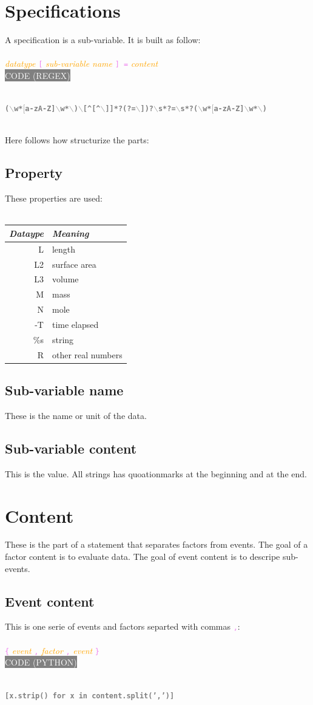 \documentclass[15pt,a4paper,oneside]{article}
\newcommand{\regex}[1]{{\tiny\\\colorbox{grey}{\textcolor{white}{CODE (REGEX)}\hspace{0.87\textwidth}}}\vspace{-2.2em}\\\begin{framed}\bf{\textcolor{grey}{\vspace{-1.5em}\\\texttt{\small #1}}}\vspace{-0.33em}\end{framed}\vspace{-0.75em}}
\newcommand{\python}[1]{{\tiny\\\colorbox{grey}{\textcolor{white}{\tiny CODE (PYTHON)}\hspace{0.855\textwidth}}}\vspace{-2.2em}\\\begin{framed}\bf{\textcolor{grey}{\vspace{-1.5em}\\\texttt{\small #1}}}\vspace{-0.33em}\end{framed}\vspace{-0.75em}}
\newcommand{\code}[1]{{\textcolor{violet}{\texttt{\small #1}}}}
\newcommand{\comment}[1]{{\textcolor{orange}{\it #1}}}
\begin{document}
\section{Specifications}
A specification is a sub-variable. It is built as follow:\\\\
\comment{datatype} \code{[} \comment{sub-variable name} \code{] =} \comment{content}
\regex{($\backslash$w*$[$a-zA-Z]$\backslash$w*$\backslash$)$\backslash$[\textasciicircum[\textasciicircum$\backslash$]]*?(?=$\backslash$])?$\backslash$s*?=$\backslash$s*?($\backslash$w*$[$a-zA-Z]$\backslash$w*$\backslash$)}
\ 
\\
Here follows how structurize the parts:
\subsection{Property}
These properties are used:\\\\
\begin{tabular}{r|l}
{\it Dataype} & {\it Meaning}\\
\hline L & length \\
\hline L2 & surface area \\
\hline L3 & volume \\
\hline M & mass \\
\hline N & mole \\
\hline -T & time elapsed\\
\hline \%s & string \\
\hline R & other real numbers\\
\end{tabular}
\subsection{Sub-variable name}
These is the name or unit of the data.
\subsection{Sub-variable  content}
This is the value. All strings has quoationmarks at the beginning and at the end.
\section{Content}
These is the part of a statement that separates factors from events. The goal of a factor content is to evaluate data. The goal of event content is to descripe sub-events.
\newpage
\subsection{Event content}
This is one serie of events and factors separted with commas \code{,}:\\\\
\code{\{} \comment{event} \code{,} \comment{factor} \code{,} \comment{event} \code{\}}
\python{[x.strip() for x in content.split(',')]}
\end{document}
